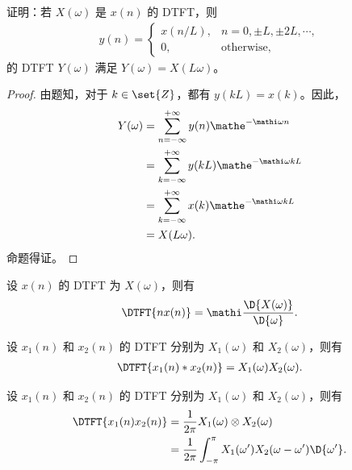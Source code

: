 \begin{exercise}
    证明：若 $X(\omega)$ 是 $x(n)$ 的 DTFT，则
    \begin{align*}
        y(n) = \begin{cases}
            x(n / L), & n = 0, \pm L, \pm 2L, \cdots, \\
            0, & \text{otherwise},
        \end{cases}
    \end{align*}
    的 DTFT $Y(\omega)$ 满足 $Y(\omega) = X(L \omega)$。
\end{exercise}

\begin{proof}
    由题知，对于 $k \in \set{Z}$，都有 $y(kL) = x(k)$。因此，
    \begin{align*}
        Y(\omega) & = \sum_{n = -\infty}^{+\infty}y(n)\mathe^{-\mathi\omega n} \\
        & = \sum_{k = -\infty}^{+\infty}y(k L)\mathe^{-\mathi\omega kL} \\
        & = \sum_{k = -\infty}^{+\infty}x(k)\mathe^{-\mathi\omega kL} \\
        & = X(L\omega).
    \end{align*}
    命题得证。
\end{proof}

\begin{property}
    设 $x(n)$ 的 DTFT 为 $X(\omega)$，则有
    \begin{align*}
        \DTFT{n x(n)} = \mathi\frac{\D{X(\omega)}}{\D{\omega}}.
    \end{align*}
\end{property}

\begin{property}
    设 $x_1(n)$ 和 $x_2(n)$ 的 DTFT 分别为 $X_1(\omega)$ 和 $X_2(\omega)$，则有
    \begin{align*}
        \DTFT{x_1(n) * x_2(n)} = X_1(\omega)X_2(\omega).
    \end{align*}
\end{property}

\begin{property}
    设 $x_1(n)$ 和 $x_2(n)$ 的 DTFT 分别为 $X_1(\omega)$ 和 $X_2(\omega)$，则有
    \begin{align*}
        \DTFT{x_1(n)x_2(n)} & = \frac{1}{2\pi}X_1(\omega) \otimes X_2(\omega) \\
        & = \frac{1}{2\pi}\int_{-\pi}^{\pi}X_1(\omega')X_2(\omega - \omega')\D{\omega'}.
    \end{align*}
\end{property}

